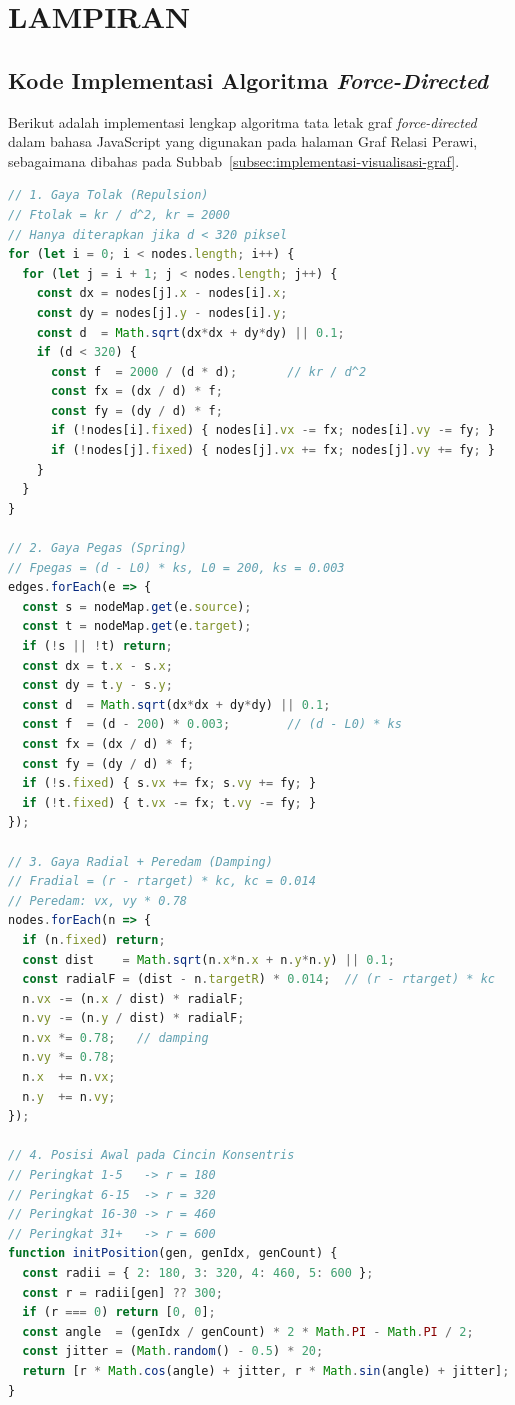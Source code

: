 \chapter*{LAMPIRAN}

\section{Kode Implementasi Algoritma \textit{Force-Directed}}
\label{lamp:kode-force-directed}
Berikut adalah implementasi lengkap algoritma tata letak graf \textit{force-directed} dalam bahasa JavaScript yang digunakan pada halaman Graf Relasi Perawi, sebagaimana dibahas pada Subbab~\ref{subsec:implementasi-visualisasi-graf}.

\begin{lstlisting}[style=mystyle, language=JavaScript, caption={Implementasi algoritma \textit{force-directed} pada visualisasi graf jaringan sanad}, label={lst:force-directed}]
// 1. Gaya Tolak (Repulsion)
// Ftolak = kr / d^2, kr = 2000
// Hanya diterapkan jika d < 320 piksel
for (let i = 0; i < nodes.length; i++) {
  for (let j = i + 1; j < nodes.length; j++) {
    const dx = nodes[j].x - nodes[i].x;
    const dy = nodes[j].y - nodes[i].y;
    const d  = Math.sqrt(dx*dx + dy*dy) || 0.1;
    if (d < 320) {
      const f  = 2000 / (d * d);       // kr / d^2
      const fx = (dx / d) * f;
      const fy = (dy / d) * f;
      if (!nodes[i].fixed) { nodes[i].vx -= fx; nodes[i].vy -= fy; }
      if (!nodes[j].fixed) { nodes[j].vx += fx; nodes[j].vy += fy; }
    }
  }
}

// 2. Gaya Pegas (Spring)
// Fpegas = (d - L0) * ks, L0 = 200, ks = 0.003
edges.forEach(e => {
  const s = nodeMap.get(e.source);
  const t = nodeMap.get(e.target);
  if (!s || !t) return;
  const dx = t.x - s.x;
  const dy = t.y - s.y;
  const d  = Math.sqrt(dx*dx + dy*dy) || 0.1;
  const f  = (d - 200) * 0.003;        // (d - L0) * ks
  const fx = (dx / d) * f;
  const fy = (dy / d) * f;
  if (!s.fixed) { s.vx += fx; s.vy += fy; }
  if (!t.fixed) { t.vx -= fx; t.vy -= fy; }
});

// 3. Gaya Radial + Peredam (Damping)
// Fradial = (r - rtarget) * kc, kc = 0.014
// Peredam: vx, vy * 0.78
nodes.forEach(n => {
  if (n.fixed) return;
  const dist    = Math.sqrt(n.x*n.x + n.y*n.y) || 0.1;
  const radialF = (dist - n.targetR) * 0.014;  // (r - rtarget) * kc
  n.vx -= (n.x / dist) * radialF;
  n.vy -= (n.y / dist) * radialF;
  n.vx *= 0.78;   // damping
  n.vy *= 0.78;
  n.x  += n.vx;
  n.y  += n.vy;
});

// 4. Posisi Awal pada Cincin Konsentris
// Peringkat 1-5   -> r = 180
// Peringkat 6-15  -> r = 320
// Peringkat 16-30 -> r = 460
// Peringkat 31+   -> r = 600
function initPosition(gen, genIdx, genCount) {
  const radii = { 2: 180, 3: 320, 4: 460, 5: 600 };
  const r = radii[gen] ?? 300;
  if (r === 0) return [0, 0];
  const angle  = (genIdx / genCount) * 2 * Math.PI - Math.PI / 2;
  const jitter = (Math.random() - 0.5) * 20;
  return [r * Math.cos(angle) + jitter, r * Math.sin(angle) + jitter];
}
\end{lstlisting}

